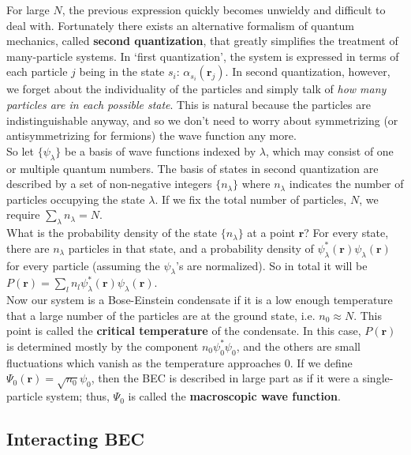 \documentclass{article}
\begin{document}
For large $N$, the previous expression quickly becomes unwieldy and difficult to deal with.  Fortunately there exists an alternative formalism of quantum mechanics, called \textbf{second quantization}, that greatly simplifies the treatment of many-particle systems.  In `first quantization', the system is expressed in terms of each particle $j$ being in the state $s_i$: $\alpha_{s_i}(\mathbf{r}_j)$.  In second quantization, however, we forget about the individuality of the particles and simply talk of \textit{how many particles are in each possible state}.  This is natural because the particles are indistinguishable anyway, and so we don't need to worry about symmetrizing (or antisymmetrizing for fermions) the wave function any more.
\\

So let $\{\psi_\lambda\}$ be a basis of wave functions indexed by $\lambda$, which may consist of one or multiple quantum numbers.  The basis of states in second quantization are described by a set of non-negative integers $\{n_\lambda\}$ where $n_\lambda$ indicates the number of particles occupying the state $\lambda$.  If we fix the total number of particles, $N$, we require $\sum_\lambda{n_\lambda} = N$.
\\

What is the probability density of the state $\{n_\lambda\}$ at a point $\mathbf{r}$?  For every state, there are $n_\lambda$ particles in that state, and a probability density of $\psi_\lambda^*(\mathbf{r}) \psi_\lambda(\mathbf{r})$ for every particle (assuming the $\psi_\lambda$'s are normalized). So in total it will be $P(\mathbf{r}) = \sum_l{n_l \psi_\lambda^*(\mathbf{r}) \psi_\lambda(\mathbf{r})}$.
\\

Now our system is a Bose-Einstein condensate if it is a low enough temperature that a large number of the particles are at the ground state, i.e. $n_0 \approx N$.  This point is called the \textbf{critical temperature} of the condensate.  In this case, $P(\mathbf{r})$ is determined mostly by the component $n_0\psi^*_0\psi_0$, and the others are small fluctuations which vanish as the temperature approaches $0$.  If we define $\Psi_0(\mathbf{r}) = \sqrt{n_0} \psi_0$, then the BEC is described in large part as if it were a single-particle system; thus, $\Psi_0$ is called the \textbf{macroscopic wave function}.

\subsection{Interacting BEC}
\end{document}
